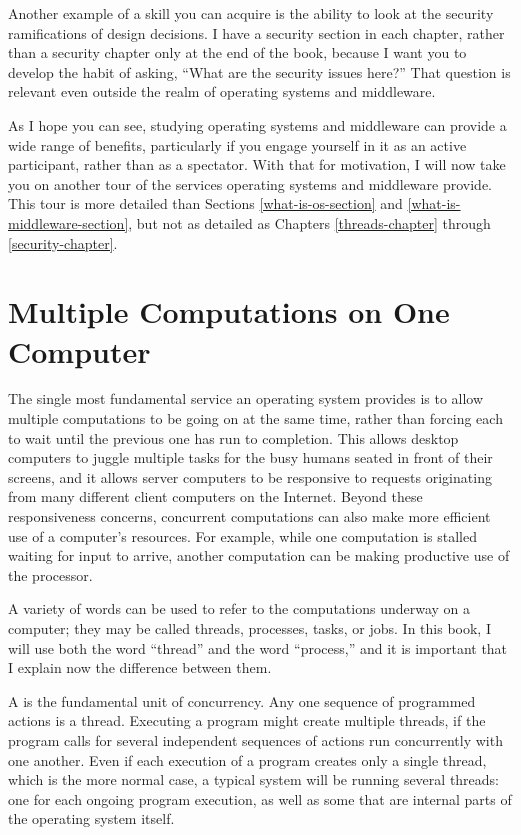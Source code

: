 Another example of a skill you can acquire is the ability to look at
the security ramifications of design decisions.  I have
a security section in each chapter, rather than a security
chapter only at the end of the book, because I want you to develop the
habit of asking, ``What are the security issues here?''  That question
is relevant even outside the realm of operating systems and
middleware.

As I hope you can see, studying operating systems and middleware can
provide a wide range of benefits, particularly if you engage yourself
in it as an active participant, rather than as a spectator.  With that
for motivation, I will now take you on another tour of the services
operating systems and middleware provide.  This tour is more detailed than
Sections \ref{what-is-os-section} and
\ref{what-is-middleware-section}, but not as detailed as Chapters
\ref{threads-chapter} through \ref{security-chapter}.

\section{Multiple Computations on One Computer}\label{concurrency-section}

The single most fundamental service an operating system provides is to
allow multiple computations to be going on at the same time, rather
than forcing each to wait until the previous one has run to
completion.  This allows desktop computers to juggle multiple tasks
for the busy humans seated in front of their screens, and it allows
server computers to be responsive to requests originating from many
different client computers on the Internet.  Beyond these
responsiveness concerns, concurrent computations can also make more
efficient use of a computer's resources.  For example, while one
computation is stalled waiting for input to arrive, another
computation can be making productive use of the processor.

A variety of words can be  used to refer to the computations underway
on a computer; they may be called threads, processes, tasks, or jobs.
In this book, I will use both the word ``thread'' and the word
``process,'' and it is important that I explain now the difference
between them.

A  is the fundamental unit of concurrency.  Any one sequence of
programmed actions is a thread.  Executing a program might create
multiple threads, if the program calls for several independent
sequences of actions run concurrently with one another.  Even if each
execution of a program creates only a single thread, which is the more
normal case, a typical system will be running several threads: one for
each ongoing program execution, as well as some that are internal
parts of the operating system itself.

